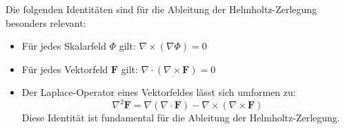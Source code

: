 Die folgenden Identitäten sind für die Ableitung der Helmholtz-Zerlegung besonders relevant:

\begin{itemize}
\item Für jedes Skalarfeld $\Phi$ gilt: $\nabla \times (\nabla \Phi) = 0$
\item Für jedes Vektorfeld $\mathbf{F}$ gilt: $\nabla \cdot (\nabla \times \mathbf{F}) = 0$
\item Der Laplace-Operator eines Vektorfeldes lässt sich umformen zu:
\begin{equation}
\nabla^2 \mathbf{F} = \nabla(\nabla \cdot \mathbf{F}) - \nabla \times (\nabla \times \mathbf{F})
\end{equation}
\noindent Diese Identität ist fundamental für die Ableitung der Helmholtz-Zerlegung.
\end{itemize}




